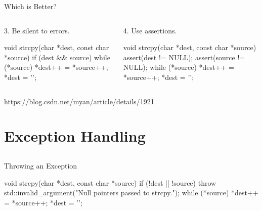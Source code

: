 \documentclass{beamer}
\begin{document}
\begin{frame}[fragile]{Which is Better?}
    \begin{columns}
        \begin{column}{0.5\textwidth}
            3. Be silent to errors.
            \begin{cpp}
void strcpy(char *dest,
    const char *source) {
  if (dest && source) {
    while (*source)
      *dest++ = *source++;
    *dest = '\0';
  }
}
            \end{cpp}
        \end{column}
        \begin{column}{0.5\textwidth}
            4. Use assertions.
            \begin{cpp}
void strcpy(char *dest,
    const char *source) {
  assert(dest != NULL);
  assert(source != NULL);
  while (*source)
    *dest++ = *source++;
  *dest = '\0';
}
            \end{cpp}
        \end{column}
    \end{columns}
    \url{https://blog.csdn.net/myan/article/details/1921}
\end{frame}

\section{Exception Handling}

\subsection{}

\begin{frame}[fragile]{Throwing an Exception}
    \begin{cpp}
void strcpy(char *dest, const char *source) {
  if (!dest || !source)
    throw std::invalid_argument("Null pointers passed to strcpy.");
  while (*source)
    *dest++ = *source++;
  *dest = '\0';
}
    \end{cpp}
\end{frame}
\end{document}
